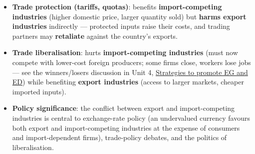 \documentclass[a4paper,12pt]{article}
\begin{document}
\begin{itemize}
\begin{itemize}
  \end{itemize}
  \item \textbf{Trade protection (tariffs, quotas)}: benefits \textbf{import-competing industries} (higher domestic price, larger quantity sold) but \textbf{harms export industries} indirectly --- protected inputs raise their costs, and trading partners may \textbf{retaliate} against the country's exports.
  \item \textbf{Trade liberalisation}: hurts \textbf{import-competing industries} (must now compete with lower-cost foreign producers; some firms close, workers lose jobs --- see the winners/losers discussion in Unit 4, \hyperref[sec:strategies]{Strategies to promote EG and ED}) while benefiting \textbf{export industries} (access to larger markets, cheaper imported inputs).
  \item \textbf{Policy significance}: the conflict between export and import-competing industries is central to exchange-rate policy (an undervalued currency favours both export and import-competing industries at the expense of consumers and import-dependent firms), trade-policy debates, and the politics of liberalisation.
\end{itemize}
\end{document}
